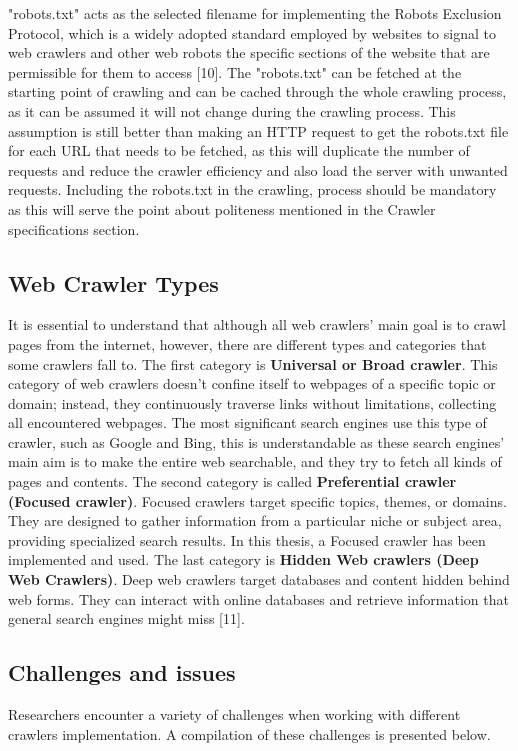 "robots.txt" acts as the selected filename for implementing the Robots Exclusion Protocol, which is a widely adopted standard employed by websites to signal to web crawlers and other web robots the specific sections of the website that are permissible for them to access [10]. The "robots.txt" can be fetched at the starting point of crawling and can be cached through the whole crawling process, as it can be assumed it will not change during the crawling process. This assumption is still better than making an HTTP request to get the robots.txt file for each URL that needs to be fetched, as this will duplicate the number of requests and reduce the crawler efficiency and also load the server with unwanted requests. Including the robots.txt in the crawling, process should be mandatory as this will serve the point about politeness mentioned in the Crawler specifications section. 

\subsection{Web Crawler Types}
It is essential to understand that although all web crawlers' main goal is to crawl pages from the internet, however, there are different types and categories that some crawlers fall to. The first category is  \textbf{Universal or Broad crawler}. This category of web crawlers doesn't confine itself to webpages of a specific topic or domain; instead, they continuously traverse links without limitations, collecting all encountered webpages. The most significant search engines use this type of crawler, such as Google and Bing, this is understandable as these search engines' main aim is to make the entire web searchable, and they try to fetch all kinds of pages and contents. The second category is called \textbf{Preferential crawler (Focused crawler)}. Focused crawlers target specific topics, themes, or domains. They are designed to gather information from a particular niche or subject area, providing specialized search results. In this thesis, a Focused crawler has been implemented and used. The last category is \textbf{Hidden Web crawlers (Deep Web Crawlers)}. Deep web crawlers target databases and content hidden behind web forms. They can interact with online databases and retrieve information that general search engines might miss [11].

\subsection{Challenges and issues}
Researchers encounter a variety of challenges when working with different crawlers implementation. A compilation of these challenges is presented below.



